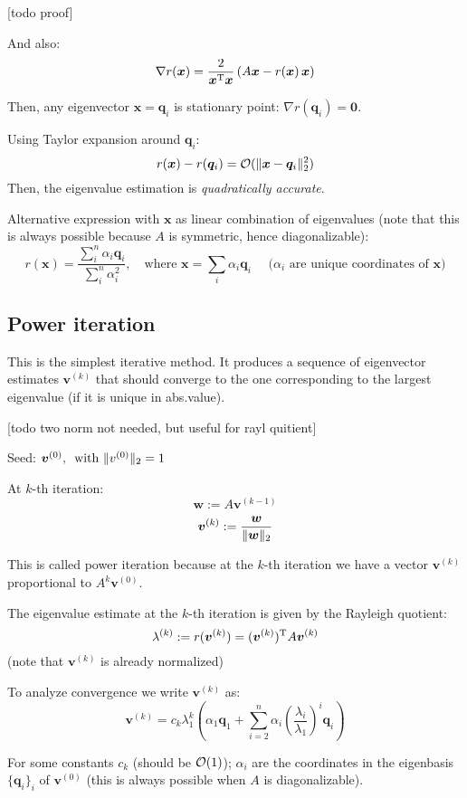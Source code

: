 \documentclass[
  12pt,
  paper=a4,
]{scrartcl} %
\begin{document}
[todo proof]

And also:
\[
    \nabla r(\bm x) = 
    \frac{2}{
        \bm x^{\mathrm{T}} \bm x
    }\,
    (A\bm x - r(\bm x)\, \bm x)
\]

Then, any eigenvector $\bm x = \bm q_i$ is stationary point: $\nabla r(\bm q_i)=\bm 0$.

Using Taylor expansion around $\bm q_i$: 
\[
    r(\bm x) - r(\bm q_i) = \mathcal{O}(\|\bm x - \bm q_i\|_2^2)
\]
Then, the eigenvalue estimation is \emph{quadratically accurate}.

Alternative expression with $\bm x$ as linear combination of eigenvalues (note that this is always possible because $A$ is symmetric, hence diagonalizable):
\[
    r(\bm x) =
    \frac{
    \displaystyle
        \sum_i^n \alpha_i \bm q_i
    }{
    \displaystyle
        \sum_i^n \alpha_i^2
    },
    \quad \text{where }
    \bm x = \sum_i \alpha_i \bm q_i
    \quad
    \text{ ($\alpha_i$ are unique coordinates of $\bm x$)}
\]


\subsection*{Power iteration}

This is the simplest iterative method. It produces a sequence of eigenvector estimates $\bm v^{(k)}$ that should converge to the one corresponding to the largest eigenvalue (if it is unique in abs.\@ value).

[todo two norm not needed, but useful for rayl quitient]

Seed: $\bm v^{(0)}, \, \text{ with }\|v^{(0)}\|_2 = 1$

At $k$-th iteration:
\[
    \bm w := A \bm v^{(k-1)}
\]
\[
    \bm v^{(k)} := \frac{\bm w}{\|\bm w\|_2}
\]

This is called power iteration because at the $k$-th iteration we have a vector $\bm v^{(k)}$ proportional to $A^k \bm v^{(0)}$.

The eigenvalue estimate at the $k$-th iteration is given by the Rayleigh quotient:
\[
    \lambda^{(k)} := r(\bm v^{(k)}) = (\bm v^{(k)})^{\mathrm{T}} A \bm v^{(k)}
\]
(note that $\bm v^{(k)}$ is already normalized)

To analyze convergence we write $\bm v^{(k)}$ as:
\[
    \bm v^{(k)} = c_k \lambda_1^k
    \left(
        \alpha_1 \bm q_1
        + \sum_{i=2}^n
        \alpha_i
        \left(\frac{\lambda_i}{\lambda_1}
        \right)^i
        \bm q_i
    \right)
\]

For some constants $c_k$ (should be $\mathcal{O}(1)$); $\alpha_i$ are the coordinates in the eigenbasis $\{\bm q_i\}_i$ of $\bm v^{(0)}$ (this is always possible when $A$ is diagonalizable).
\end{document}
